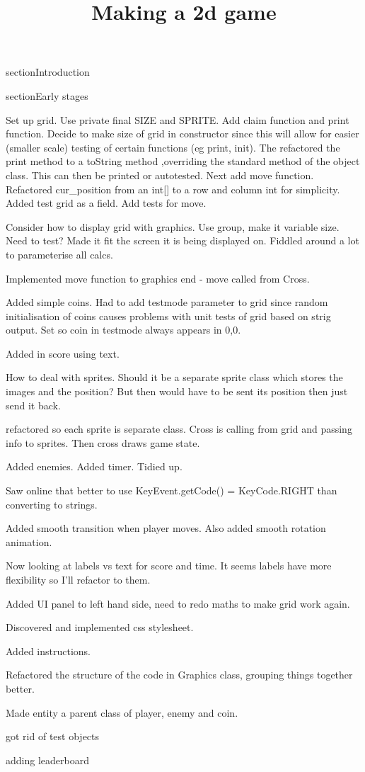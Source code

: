 \documentclass{article}
\begin{document}
\title{Making a 2d game}
\maketitle

section{Introduction}

section{Early stages}

Set up grid. Use private final SIZE and SPRITE. Add claim function and print function. Decide to make size of grid
in constructor since this will allow for easier (smaller scale) testing of certain functions (eg print, init).
The refactored the print method to a toString method ,overriding the standard method of the object class. This
can then be printed or autotested. Next add move function. Refactored cur_position from an int[] to a row and
column int for simplicity. Added test grid as a field. Add tests for move.

Consider how to display grid with graphics. Use group, make it variable size. Need to test? Made it fit the screen
it is being displayed on. Fiddled around a lot to parameterise all calcs.

Implemented move function to graphics end - move called from Cross.

Added simple coins. Had to add testmode parameter to grid since random initialisation of coins causes problems with
unit tests of grid based on strig output. Set so coin in testmode always appears in 0,0.

Added in score using text.

How to deal with sprites. Should it be a separate sprite class which stores the images and the position? But then
would have to be sent its position then just send it back.

refactored so each sprite is separate class. Cross is calling from grid and passing info to sprites. Then cross draws
game state.

Added enemies. Added timer. Tidied up.

Saw online that better to use KeyEvent.getCode() = KeyCode.RIGHT than converting to strings.

Added smooth transition when player moves. Also added smooth rotation animation.

Now looking at labels vs text for score and time. It seems labels have more flexibility so I'll refactor to them.

Added UI panel to left hand side, need to redo maths to make grid work again.

Discovered and implemented css stylesheet.

Added instructions.

Refactored the structure of the code in Graphics class, grouping things together better.

Made entity a parent class of player, enemy and coin.

got rid of test objects

adding leaderboard
\end{document}
